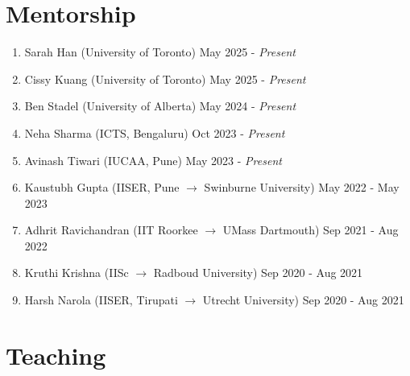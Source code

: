 		\section{Mentorship}
		\begin{enumerate}[leftmargin=*]
			\item Sarah Han (University of Toronto) \hfill May 2025 - \textit{Present}
			\item Cissy Kuang (University of Toronto) \hfill May 2025 - \textit{Present}
			\item Ben Stadel (University of Alberta) \hfill May 2024 - \textit{Present}
			\item Neha Sharma (ICTS, Bengaluru) \hfill Oct 2023 - \textit{Present}
			\item Avinash Tiwari (IUCAA, Pune) \hfill May 2023 - \textit{Present}
			\item Kaustubh Gupta (IISER, Pune $\rightarrow$ Swinburne University) \hfill May 2022 - May 2023
			\item Adhrit Ravichandran (IIT Roorkee $\rightarrow$ UMass Dartmouth) \hfill Sep 2021 - Aug 2022
			\item Kruthi Krishna (IISc $ \rightarrow $ Radboud University) \hfill Sep 2020 - Aug 2021
			\item Harsh Narola (IISER, Tirupati $ \rightarrow $ Utrecht University) \hfill Sep 2020 - Aug 2021
		\end{enumerate}
		
		\section{Teaching}
		
